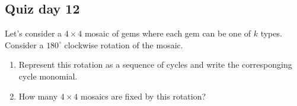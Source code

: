 \documentclass[12pt]{article}
\begin{document}


\subsection*{Quiz day 12}

Let's consider a $4 \times 4$ mosaic of gems where each gem can be one of $k$ types. 
Consider a $180^{\circ}$ clockwise rotation of the mosaic.
\begin{enumerate}
    \item Represent this rotation as a sequence of cycles and write the corresponging cycle monomial. 
    \item How many $4\times 4$ mosaics are fixed by this rotation?
\end{enumerate}
\end{document}
